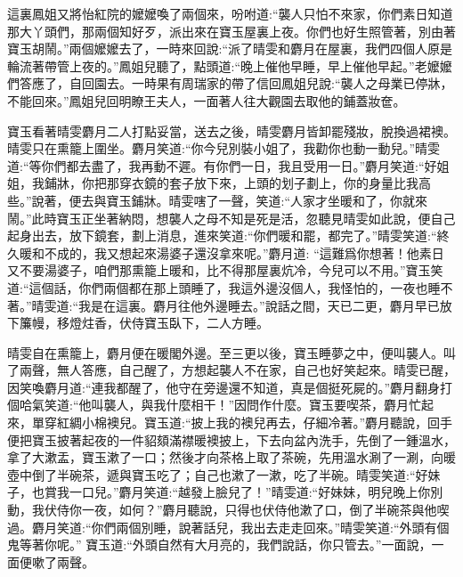 \begin{parag}
    這裏鳳姐又將怡紅院的嬤嬤喚了兩個來，吩咐道:“襲人只怕不來家，你們素日知道那大丫頭們，那兩個知好歹，派出來在寶玉屋裏上夜。你們也好生照管著，別由著寶玉胡鬧。”兩個嬤嬤去了，一時來回說:“派了晴雯和麝月在屋裏，我們四個人原是輪流著帶管上夜的。”鳳姐兒聽了，點頭道:“晚上催他早睡，早上催他早起。”老嬤嬤們答應了，自回園去。一時果有周瑞家的帶了信回鳳姐兒說:“襲人之母業已停牀，不能回來。”鳳姐兒回明瞭王夫人，一面著人往大觀園去取他的鋪蓋妝奩。
\end{parag}


\begin{parag}
    寶玉看著晴雯麝月二人打點妥當，送去之後，晴雯麝月皆卸罷殘妝，脫換過裙襖。晴雯只在熏籠上圍坐。麝月笑道:“你今兒別裝小姐了，我勸你也動一動兒。”晴雯道:“等你們都去盡了，我再動不遲。有你們一日，我且受用一日。”麝月笑道:“好姐姐，我鋪牀，你把那穿衣鏡的套子放下來，上頭的划子劃上，你的身量比我高些。”說著，便去與寶玉鋪牀。晴雯嗐了一聲，笑道:“人家才坐暖和了，你就來鬧。”此時寶玉正坐著納悶，想襲人之母不知是死是活，忽聽見晴雯如此說，便自己起身出去，放下鏡套，劃上消息，進來笑道:“你們暖和罷，都完了。”晴雯笑道:“終久暖和不成的，我又想起來湯婆子還沒拿來呢。”麝月道: “這難爲你想著！他素日又不要湯婆子，咱們那熏籠上暖和，比不得那屋裏炕冷，今兒可以不用。”寶玉笑道:“這個話，你們兩個都在那上頭睡了，我這外邊沒個人，我怪怕的，一夜也睡不著。”晴雯道:“我是在這裏。麝月往他外邊睡去。”說話之間，天已二更，麝月早已放下簾幔，移燈炷香，伏侍寶玉臥下，二人方睡。
\end{parag}


\begin{parag}
    晴雯自在熏籠上，麝月便在暖閣外邊。至三更以後，寶玉睡夢之中，便叫襲人。叫了兩聲，無人答應，自己醒了，方想起襲人不在家，自己也好笑起來。晴雯已醒，因笑喚麝月道:“連我都醒了，他守在旁邊還不知道，真是個挺死屍的。”麝月翻身打個哈氣笑道:“他叫襲人，與我什麼相干！”因問作什麼。寶玉要喫茶，麝月忙起來，單穿紅綢小棉襖兒。寶玉道:“披上我的襖兒再去，仔細冷著。”麝月聽說，回手便把寶玉披著起夜的一件貂頦滿襟暖襖披上，下去向盆內洗手，先倒了一鍾溫水，拿了大漱盂，寶玉漱了一口；然後才向茶格上取了茶碗，先用溫水涮了一涮，向暖壺中倒了半碗茶，遞與寶玉吃了；自己也漱了一漱，吃了半碗。晴雯笑道:“好妹子，也賞我一口兒。”麝月笑道:“越發上臉兒了！”晴雯道:“好妹妹，明兒晚上你別動，我伏侍你一夜，如何？”麝月聽說，只得也伏侍他漱了口，倒了半碗茶與他喫過。麝月笑道:“你們兩個別睡，說著話兒，我出去走走回來。”晴雯笑道:“外頭有個鬼等著你呢。” 寶玉道:“外頭自然有大月亮的，我們說話，你只管去。”一面說，一面便嗽了兩聲。
\end{parag}


